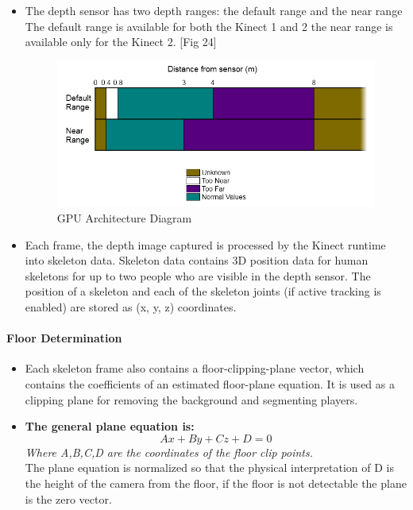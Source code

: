 \documentclass[a4paper,10pt]{article}
\begin{document}
\begin{itemize}
\item The depth sensor has two depth ranges: the default range and the near range The default range is available for both the Kinect 1 and 2 the near range is available only for the Kinect 2. [Fig 24]
\begin{figure}[H] %
	\includegraphics[width=\linewidth,height=\paperheight,keepaspectratio]{kinectRange.png}
	\caption{GPU Architecture Diagram}
	\label{fig:kinectRange}
	\end{figure}
\item Each frame, the depth image captured is processed by the Kinect runtime into skeleton data. Skeleton data contains 3D position data for human skeletons for up to two people who
are visible in the depth sensor. The position of a skeleton and each of the skeleton joints (if active tracking is enabled) are stored as (x, y, z) coordinates.

\end{itemize}
	
\paragraph{Floor Determination}
\begin{itemize}

\item Each skeleton frame also contains a floor-clipping-plane vector, which contains the coefficients of an estimated floor-plane equation. It is used as a clipping plane for
removing the background and segmenting players.
\item \textbf{The general plane equation is:}
\begin{equation}
  Ax + By + Cz + D = 0 
\end{equation}
\textit{Where A,B,C,D are the coordinates of the floor clip points.}~\\
The plane equation is normalized so that the physical interpretation of D is the height of the camera from the floor, if the floor is not detectable 
the plane is the zero vector.

\end{itemize}
\end{document}
